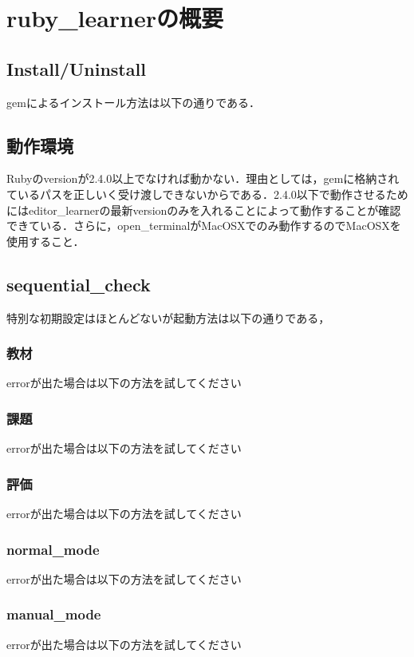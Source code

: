 \chapter{ruby\_learnerの概要}
\section{Install/Uninstall}\label{install/uninstall}
gemによるインストール方法は以下の通りである．

\section{動作環境}\label{operating_environment}
Rubyのversionが2.4.0以上でなければ動かない．理由としては，gemに格納されているパスを正しいく受け渡しできないからである．2.4.0以下で動作させるためにはeditor\_learnerの最新versionのみを入れることによって動作することが確認できている．さらに，open\_terminalがMacOSXでのみ動作するのでMacOSXを使用すること．

\section{sequential\_check}\label{sequential_check}
特別な初期設定はほとんどないが起動方法は以下の通りである，

\subsection{教材}\label{text}
errorが出た場合は以下の方法を試してください

\subsection{課題}\label{question}
errorが出た場合は以下の方法を試してください

\subsection{評価}\label{evaluation}
errorが出た場合は以下の方法を試してください

\subsection{normal\_mode}\label{nomal_mode}
errorが出た場合は以下の方法を試してください

\subsection{manual\_mode}\label{manual_mode}
errorが出た場合は以下の方法を試してください

